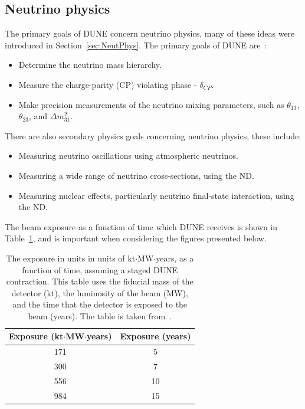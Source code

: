 \subsection{Neutrino physics} \label{sec:DUNEPhys_Neut} %
The primary goals of DUNE concern neutrino physics, many of these ideas were introduced in Section~\ref{sec:NeutPhys}. The primary goals of DUNE are~\citep{DUNECDR_V2}:
\begin{itemize}
\item Determine the neutrino mass hierarchy.
\item Measure the charge-parity (CP) violating phase - $\delta_{CP}$.
\item Make precision measurements of the neutrino mixing parameters, such as $\theta_{13}$, $\theta_{23}$, and $\Delta m^{2}_{31}$.
\end{itemize}
There are also secondary physics goals concerning neutrino physics, these include:
\begin{itemize}
\item Measuring neutrino oscillations using atmospheric neutrinos.
\item Measuring a wide range of neutrino cross-sections, using the ND.
\item Measuring nuclear effects, particularly neutrino final-state interaction, using the ND.
\end{itemize}
The beam exposure as a function of time which DUNE receives is shown in Table~\ref{tab:DUNEExposure}, and is important when considering the figures presented below. \\

\begin{table}
\caption[The exposure in units in units of kt$\cdot$MW$\cdot$years, as a function of time, assuming a staged DUNE construction]
        {The exposure in units in units of kt$\cdot$MW$\cdot$years, as a function of time, assuming a staged DUNE contraction. This table uses the fiducial mass of the detector (kt), the luminosity of the beam (MW), and the time that the detector is exposed to the beam (years). The table is taken from~\citep{Elizabeth_01_17}.}
\centering
\label{tab:DUNEExposure}
\begin{tabular}{c c}
\toprule
{Exposure (kt$\cdot$MW$\cdot$years)} & {Exposure (years)} \\
\midrule
171                      & 5 \\

300                      & 7 \\

556                      & 10 \\

984                      & 15 \\
\bottomrule
\end{tabular}
\end{table}

